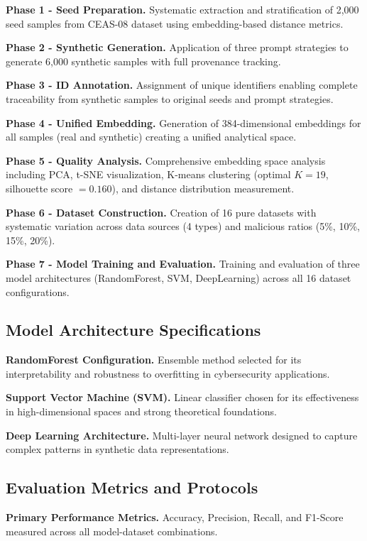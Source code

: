 \textbf{Phase 1 - Seed Preparation.} Systematic extraction and stratification of 2,000 seed samples from CEAS-08 dataset using embedding-based distance metrics.

\textbf{Phase 2 - Synthetic Generation.} Application of three prompt strategies to generate 6,000 synthetic samples with full provenance tracking.

\textbf{Phase 3 - ID Annotation.} Assignment of unique identifiers enabling complete traceability from synthetic samples to original seeds and prompt strategies.

\textbf{Phase 4 - Unified Embedding.} Generation of 384-dimensional embeddings for all samples (real and synthetic) creating a unified analytical space.

\textbf{Phase 5 - Quality Analysis.} Comprehensive embedding space analysis including PCA, t-SNE visualization, K-means clustering (optimal $K=19$, silhouette score $= 0.160$), and distance distribution measurement.

\textbf{Phase 6 - Dataset Construction.} Creation of 16 pure datasets with systematic variation across data sources (4 types) and malicious ratios (5\%, 10\%, 15\%, 20\%).

\textbf{Phase 7 - Model Training and Evaluation.} Training and evaluation of three model architectures (RandomForest, SVM, DeepLearning) across all 16 dataset configurations.

\subsection{Model Architecture Specifications}

\textbf{RandomForest Configuration.} Ensemble method selected for its interpretability and robustness to overfitting in cybersecurity applications.

\textbf{Support Vector Machine (SVM).} Linear classifier chosen for its effectiveness in high-dimensional spaces and strong theoretical foundations.

\textbf{Deep Learning Architecture.} Multi-layer neural network designed to capture complex patterns in synthetic data representations.

\subsection{Evaluation Metrics and Protocols}

\textbf{Primary Performance Metrics.} Accuracy, Precision, Recall, and F1-Score measured across all model-dataset combinations.

